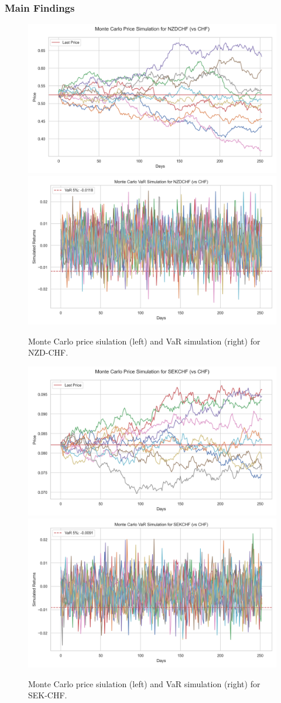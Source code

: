 \documentclass[10pt]{beamer}
\begin{document}
\begin{frame}
\frametitle{Main Findings}
\begin{figure}
    \centering  \includegraphics[width=0.48\linewidth]{reports/figures/monte_carlo_price_simulation_NZDCHF_vs_CHF.png}  \label{fig:monte_carlo_price_simulation_NZDCHF_vs_CHF}
    \includegraphics[width=0.48\linewidth]{reports/figures/monte_carlo_var_simulation_NZDCHF_vs_CHF.png}  \label{fig:monte_carlo_var_simulation_NZDCHF_vs_CHF}
    \caption{\footnotesize Monte Carlo price siulation (left) and VaR simulation (right) for NZD-CHF.}
\end{figure}
\begin{figure}
    \centering   \includegraphics[width=0.48\linewidth]{reports/figures/monte_carlo_price_simulation_SEKCHF_vs_CHF.png} \label{fig:monte_carlo_price_simulation_SEKCHF_vs_CHF}
    \includegraphics[width=0.48\linewidth]{reports/figures/monte_carlo_var_simulation_SEKCHF_vs_CHF.png} \label{fig:monte_carlo_var_simulation_SEKCHF_vs_CHF}
    \caption{\footnotesize Monte Carlo price siulation (left) and VaR simulation (right) for SEK-CHF.}
\end{figure}
\end{frame}
\end{document}
